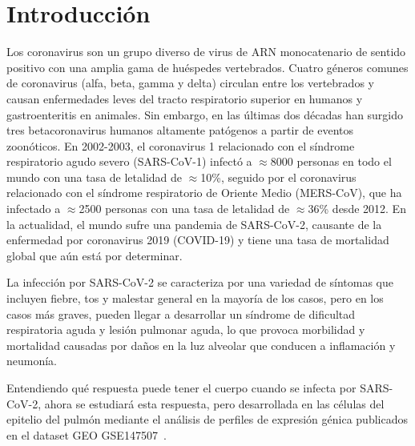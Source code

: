 \section{Introducción}
Los coronavirus son un grupo diverso de virus de ARN monocatenario de sentido positivo con una amplia gama de huéspedes vertebrados. Cuatro géneros comunes de coronavirus (alfa, beta, gamma y delta) circulan entre los vertebrados y causan enfermedades leves del tracto respiratorio superior en humanos y gastroenteritis en animales. Sin embargo, en las últimas dos décadas han surgido tres betacoronavirus humanos altamente patógenos a partir de eventos zoonóticos. En 2002-2003, el coronavirus 1 relacionado con el síndrome respiratorio agudo severo (SARS-CoV-1) infectó a $\approx$8000 personas en todo el mundo con una tasa de letalidad de $\approx$10\%, seguido por el coronavirus relacionado con el síndrome respiratorio de Oriente Medio (MERS-CoV), que ha infectado a $\approx$2500 personas con una tasa de letalidad de $\approx$36\% desde 2012. En la actualidad, el mundo sufre una pandemia de SARS-CoV-2, causante de la enfermedad por coronavirus 2019 (COVID-19) y tiene una tasa de mortalidad global que aún está por determinar.

La infección por SARS-CoV-2 se caracteriza por una variedad de síntomas que incluyen fiebre, tos y malestar general en la mayoría de los casos, pero en los casos más graves, pueden llegar a desarrollar un síndrome de dificultad respiratoria aguda y lesión pulmonar aguda, lo que provoca morbilidad y mortalidad causadas por daños en la luz alveolar que conducen a inflamación y neumonía.

Entendiendo qué respuesta puede tener el cuerpo cuando se infecta por SARS-CoV-2, ahora se estudiará esta respuesta, pero desarrollada en las células del epitelio del pulmón mediante el análisis de perfiles de expresión génica publicados en el dataset GEO GSE147507~\cite{BlancoMelo2020}.